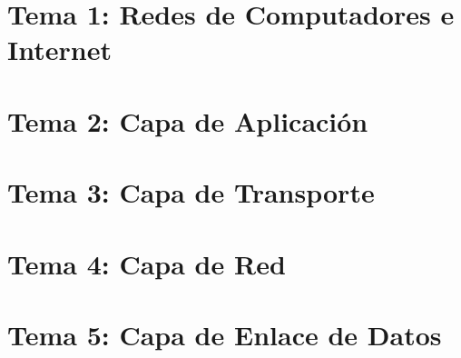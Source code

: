 \renewcommand{\contentsname}{Indice}
\tableofcontents
\newpage
\section{Tema 1: Redes de Computadores e Internet}

\newpage
\section{Tema 2: Capa de Aplicación}

\newpage
\section{Tema 3: Capa de Transporte}

\newpage
\section{Tema 4: Capa de Red}

\newpage
\section{Tema 5: Capa de Enlace de Datos}

